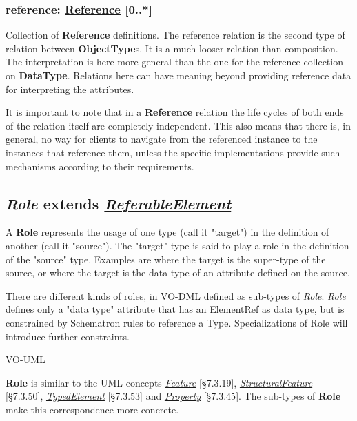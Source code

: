\documentclass[10pt,a4paper]{ivoa}
\begin{document}
\hypertarget{reference-reference-0..-1}{%
\subsubsection{\texorpdfstring{reference:
\protect\hyperlink{reference-extends-relation}{Reference}
{[}0..*{]}}{reference: Reference {[}0..*{]}}}\label{reference-reference-0..-1}}

Collection of \textbf{Reference} definitions. The reference relation is
the second type of relation between \textbf{ObjectType}s. It is a much
looser relation than composition. The interpretation is here more
general than the one for the reference collection on \textbf{DataType}.
Relations here can have meaning beyond providing reference data for
interpreting the attributes.

It is important to note that in a \textbf{Reference} relation the life
cycles of both ends of the relation itself are completely independent.
This also means that there is, in general, no way for clients to
navigate from the referenced instance to the instances that reference
them, unless the specific implementations provide such mechanisms
according to their requirements.

\hypertarget{role-extends-referableelement}{%
\subsection{\texorpdfstring{\emph{Role} extends
\protect\hyperlink{type-extends-referableelement}{\emph{ReferableElement}}}{Role extends ReferableElement}}\label{role-extends-referableelement}}

A \textbf{Role} represents the usage of one type (call it "target") in
the definition of another (call it "source"). The "target" type is said
to play a role in the definition of the "source" type. Examples are
where the target is the super-type of the source, or where the target is
the data type of an attribute defined on the source.

There are different kinds of roles, in VO-DML defined as sub-types of
\emph{Role}. \emph{Role} defines only a "data type" attribute that has
an ElementRef as data type, but is constrained by Schematron rules to
reference a Type. Specializations of Role will introduce further
constraints.

VO-UML

\textbf{Role} is similar to the UML concepts
\href{http://www.uml-diagrams.org/uml-core.html\#feature}{\emph{Feature}}
{[}§7.3.19{]},
\href{http://www.uml-diagrams.org/uml-core.html\#structural-feature}{\emph{StructuralFeature}}
{[}§7.3.50{]},
\href{http://www.uml-diagrams.org/uml-core.html\#type}{\emph{TypedElement}}
{[}§7.3.53{]} and
\href{http://www.uml-diagrams.org/property.html}{\emph{Property}}
{[}§7.3.45{]}. The sub-types of \textbf{Role} make this correspondence
more concrete.
\end{document}
